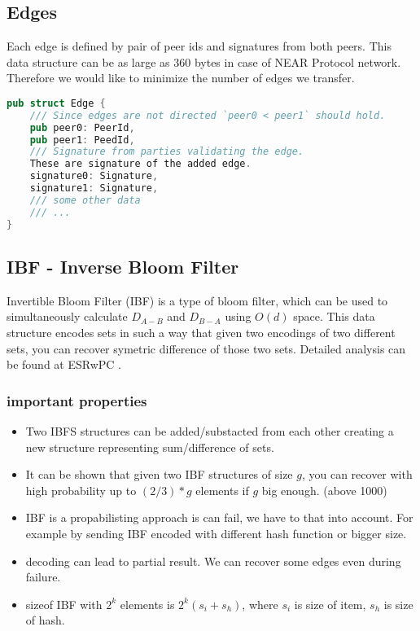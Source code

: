 \documentclass[11pt]{article}
\begin{document}
\subsection{Edges}
Each edge is defined by pair of peer ids and signatures from both peers.
This data structure can be as large as 360 bytes in case of NEAR Protocol network. 
Therefore we would like to minimize the number of edges we transfer.
\begin{lstlisting}[language=Rust]
pub struct Edge {
    /// Since edges are not directed `peer0 < peer1` should hold.
    pub peer0: PeerId,
    pub peer1: PeedId,
    /// Signature from parties validating the edge.
    These are signature of the added edge.
    signature0: Signature,
    signature1: Signature,
    /// some other data
    /// ...
}
\end{lstlisting}

\subsection{IBF - Inverse Bloom Filter}
Invertible Bloom Filter (IBF) is a type of bloom filter, which can be used to simultaneously calculate  $D_{A-B}$ and $D_{B-A}$ using $O(d)$ space.
This data structure encodes sets in such a way that given two encodings  of two different sets, you can recover symetric difference of those two sets.
Detailed analysis can be found at ESRwPC \cite{esrwpc}.
\subsubsection{important properties}
\begin{itemize}
\item Two IBFS structures can be added/substacted from each other creating a new structure representing sum/difference of sets.
\item It can be shown that given two IBF structures of size $g$, you can recover with high probability up to $(2/3)*g$ elements if $g$ big enough. (above 1000)  \cite{esrwpc}
\item IBF is a propabilisting approach is can fail, we have to that into account. For example by sending IBF encoded with different hash function or bigger size.
\item decoding can lead to partial result. We can recover some edges even during failure.
\item sizeof IBF with $2^k$ elements is $2^k(s_i + s_h)$, where $s_i$ is size of item, $s_h$ is size of hash.
\end{itemize}
\end{document}
